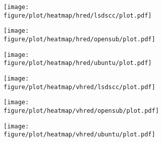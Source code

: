 \begin{figure}
    \centering
    \begin{subfigure}{0.5\linewidth}
        \centering
        \texttt{[image: figure/plot/heatmap/hred/lsdscc/plot.pdf]}
    \end{subfigure}%
    \begin{subfigure}{0.5\linewidth}
        \centering
        \texttt{[image: figure/plot/heatmap/hred/opensub/plot.pdf]}
    \end{subfigure}
    \begin{subfigure}{0.5\linewidth}
        \centering
        \texttt{[image: figure/plot/heatmap/hred/ubuntu/plot.pdf]}
    \end{subfigure}%
    \begin{subfigure}{0.5\linewidth}
        \centering
        \texttt{[image: figure/plot/heatmap/vhred/lsdscc/plot.pdf]}
    \end{subfigure}
    \begin{subfigure}{0.5\linewidth}
        \centering
        \texttt{[image: figure/plot/heatmap/vhred/opensub/plot.pdf]}
    \end{subfigure}%
    \begin{subfigure}{0.5\linewidth}
        \centering
        \texttt{[image: figure/plot/heatmap/vhred/ubuntu/plot.pdf]}
    \end{subfigure}
    \caption{}
    \label{fig:corr_heatmap}
\end{figure}

